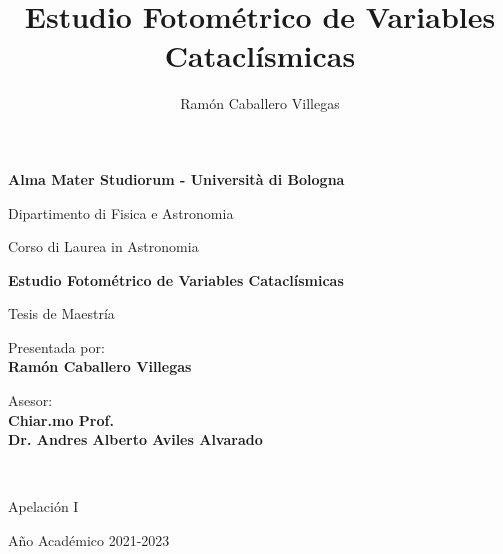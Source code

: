 \documentclass[12pt,a4paper]{report}
\newcommand{\ag}{\`a}
\begin{document}
\title{Estudio Fotométrico de Variables Cataclísmicas}
\author{Ramón Caballero Villegas}

\begin{titlepage}
    \begin{center}
        \vspace*{0.2cm}
        {\fontsize{19pt}{20pt}\selectfont \textbf{Alma Mater Studiorum - Universit{\ag} di Bologna}\par}
    
        \noindent\hrulefill
        \vspace{0.8cm}
        
        \Large
        
        Dipartimento di Fisica e Astronomia
        
        Corso di Laurea in Astronomia
        
        \Large
        \vspace{5cm}
        {\fontsize{22.5pt}{22.5}\textcolor{MyDarkBlue}{\textbf{Estudio Fotométrico de Variables Cataclísmicas}}}

        
        \vspace{1cm}
        {\fontsize{16pt}{16pt}Tesis de Maestría}
        
        \vspace{4.5cm}
        \begin{minipage}[t]{0.34\textwidth}
        \begin{flushleft}
        {\fontsize{16pt}{16pt}Presentada por: \\ \textbf{\textcolor{MyDarkBlue}{Ramón Caballero Villegas}}}
        \end{flushleft}
        \end{minipage}
        \begin{minipage}[t]{0.64\textwidth}
        \begin{flushright} \Large
        Asesor: \\
        \textbf{\textcolor{MyDarkBlue}{Chiar.mo Prof.}} 
		\\\textbf{\textcolor{MyDarkBlue}{Dr. Andres Alberto Aviles Alvarado}} 
        \end{flushright}
        \end{minipage}\\
        
        \vfill
        \noindent\hrulefill
        \vspace{0.3cm}
        \Large
        
        Apelación {\textcolor{MyDarkBlue} {I}} 
        
        Año Académico {\textcolor{MyDarkBlue} {2021-2023}}
    \end{center}
\end{titlepage}
\end{document}
